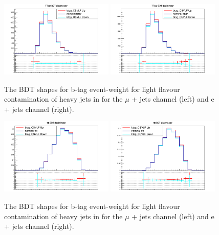 \begin{figure}[ht!]
    \includegraphics[width=0.48\textwidth]{images/Run2/Sys/btag_CSVLFsystt.png}
    \includegraphics[width=0.48\textwidth]{images/Run2/Sys/btag_CSVLFsystt_e.png}     
    \caption{The BDT shapes for b-tag event-weight for light flavour contamination of heavy jets in \ttbar for the $\mu$ + jets channel (left) and e + jets channel (right).}
    \label{fig:SysShapesLFsystt}
\end{figure}
\begin{figure}[ht!]
    \includegraphics[width=0.48\textwidth]{images/Run2/Sys/btag_CSVLFsystttt.png}
    \includegraphics[width=0.48\textwidth]{images/Run2/Sys/btag_CSVLFsystttt_e.png}     
    \caption{The BDT shapes for b-tag event-weight for light flavour contamination of heavy jets in \tttt for the $\mu$ + jets channel (left) and e + jets channel (right).}
    \label{fig:SysShapesLFsystttt}
\end{figure}

